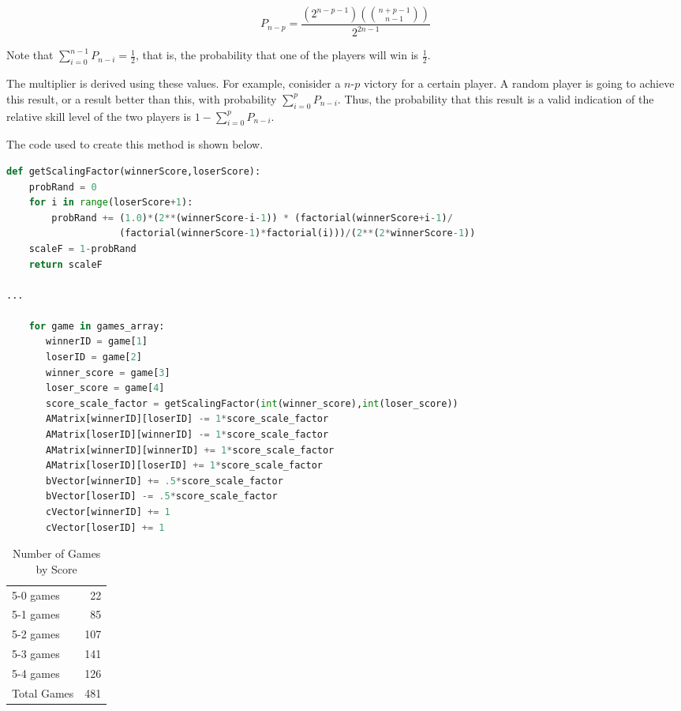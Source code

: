 \documentclass[12pt, letterpaper]{article}
\begin{document}
$$ P_{n-p} = \frac{(2^{n-p-1})({{n+p-1} \choose {n-1}})}{2^{2n-1}} $$

\par Note that $\displaystyle \sum_{i=0}^{n-1}{P_{n-i}} = \frac{1}{2}$, that is, the probability that one of the players will win is $\frac{1}{2}$.

\par The multiplier is derived using these values.  For example, conisider a $n$-$p$ victory for a certain player.  A random player is going to achieve this result, or a result better than this, with probability $\sum_{i=0}^{p}{P_{n-i}}$.  Thus, the probability that this result is a valid indication of the relative skill level of the two players is $1-\sum_{i=0}^{p}{P_{n-i}}$.

\par The code used to create this method is shown below.
\begin{lstlisting}[language=python]
def getScalingFactor(winnerScore,loserScore):
    probRand = 0
    for i in range(loserScore+1):
        probRand += (1.0)*(2**(winnerScore-i-1)) * (factorial(winnerScore+i-1)/
                    (factorial(winnerScore-1)*factorial(i)))/(2**(2*winnerScore-1))
    scaleF = 1-probRand
    return scaleF
    
...

    for game in games_array:
       winnerID = game[1]
       loserID = game[2]
       winner_score = game[3]
       loser_score = game[4]
       score_scale_factor = getScalingFactor(int(winner_score),int(loser_score))
       AMatrix[winnerID][loserID] -= 1*score_scale_factor
       AMatrix[loserID][winnerID] -= 1*score_scale_factor
       AMatrix[winnerID][winnerID] += 1*score_scale_factor     
       AMatrix[loserID][loserID] += 1*score_scale_factor
       bVector[winnerID] += .5*score_scale_factor
       bVector[loserID] -= .5*score_scale_factor
       cVector[winnerID] += 1
       cVector[loserID] += 1
\end{lstlisting}

\begin{table}
\centering
\begin{tabular}{|l|r|}
\hline
5-0 games & 22 \\
5-1 games & 85 \\
5-2 games & 107 \\
5-3 games & 141 \\
5-4 games & 126 \\
\hline
Total Games & 481 \\ 
\hline
\end{tabular}
\caption{Number of Games by Score}
\label{TabNumGames}
\end{table}
\end{document}
